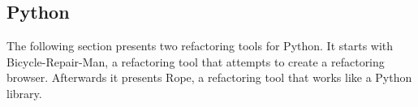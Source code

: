 \subsection{Python}

The following section presents two refactoring tools for Python. 
It starts with Bicycle-Repair-Man, a refactoring tool that attempts to create a refactoring browser. 
Afterwards it presents Rope, a refactoring tool that works like a Python library.


